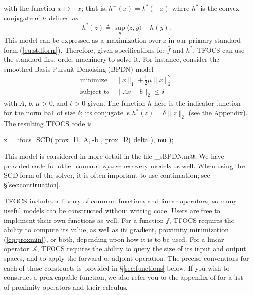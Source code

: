 \documentclass{article}
\newcommand{\cA}{\ensuremath{\mathcal{A}}}    %
\newcommand\thalf{{\textstyle\frac{1}{2}}}
\newcommand{\<}{\langle}
\renewcommand{\>}{\rangle}
\begin{document}
with the function $x \mapsto -x$; 
that is, $h^{-}(x) = h^*(-x)$
where $h^*$ is the convex conjugate of $h$ defined as
\begin{equation} \label{eq:conjugate} %
	h^*(z) \triangleq \textstyle \sup_y \<z,y\> - h(y).
\end{equation}
This model can be expressed as a maximization over $z$ in
our primary standard form (\ref{eq:stdform}). 
Therefore, given
specifications for $\bar{f}$ and $h^*$, TFOCS can use the standard
first-order machinery to solve it. For instance,
consider the smoothed Basis Pursuit Denoising (BPDN) model
\begin{equation}
	\begin{array}{ll}
		\text{minimize}   & \|x\|_1+\thalf\mu\|x\|_2^2 \\
		\text{subject to} & \|Ax-b\|_2 \leq \delta
	\end{array}
\end{equation}
with $A$, $b$, $\mu>0$, and $\delta>0$ given. The function $h$
here is the indicator function for the norm ball of size $\delta$; its conjugate
is $h^*(z)=\delta\|z\|_2$ (see the Appendix). The resulting TFOCS code is  %
\begin{code}
	x = tfocs_SCD( prox_l1, { A, -b }, prox_l2( delta ), mu  );
\end{code}
This model is considered in more detail in the file \verb@solver_sBPDN.m@.
We have provided code for other common sparse recovery models
as well. When using the SCD form of the solver, it is often important
to use continuation; see \S\ref{sec:continuation}.

TFOCS includes a library of common functions and linear
operators, so many useful models can be constructed without
writing code. Users are free to implement their own functions as well.
For a function $f$, TFOCS requires the ability to compute its value,
as well as its gradient, proximity minimization
(\ref{eq:proxmin}), or both, depending upon how it is to be used.
For a linear operator $\cA$, TFOCS requires the ability to query
the size of its input and output spaces, and to
apply the forward or adjoint operation.
The precise conventions for each of these constructs is
provided in \S\ref{sec:functions} below. If you wish to
construct a prox-capable function, we also refer you
to the appendix of \cite{prox} for a list of proximity operators
and their calculus.
\end{document}
